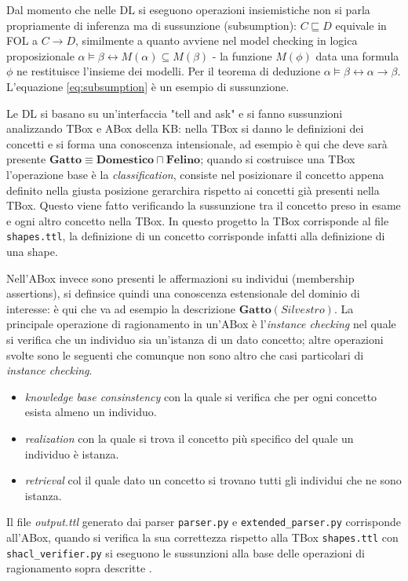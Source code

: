 \documentclass{article}
\begin{document}
Dal momento che nelle DL si eseguono operazioni insiemistiche non si parla propriamente di inferenza ma di sussunzione (subsumption): $C \sqsubseteq D$ equivale in FOL a $C \rightarrow D$, similmente a quanto avviene nel model checking in logica proposizionale $\alpha \models \beta \longleftrightarrow M(\alpha) \subseteq M(\beta)$ - la funzione $M(\phi)$ data una formula $\phi$ ne restituisce l'insieme dei modelli. Per il teorema di deduzione $\alpha \models \beta  \longleftrightarrow \alpha \rightarrow \beta$. L'equazione \ref{eq:subsumption} è un esempio di sussunzione.

Le DL si basano su un'interfaccia "tell and ask" e si fanno sussunzioni analizzando TBox e ABox della KB: nella TBox si danno le definizioni dei concetti e si forma una conoscenza intensionale, ad esempio è qui che deve sarà presente $ \textbf{Gatto} \equiv \textbf{Domestico} \sqcap \textbf{Felino} $; quando si costruisce una TBox l'operazione base è la \textit{classification}, consiste nel posizionare il concetto appena definito nella giusta posizione gerarchira rispetto ai concetti già presenti nella TBox. Questo viene fatto verificando la sussunzione tra il concetto preso in esame e ogni altro concetto nella TBox. In questo progetto la TBox corrisponde al file \texttt{shapes.ttl}, la definizione di un concetto corrisponde infatti alla definizione di una shape.

Nell'ABox invece sono presenti le affermazioni su individui (membership assertions), si definsice quindi una conoscenza estensionale del dominio di interesse: è qui che va ad esempio la descrizione $ \textbf{Gatto}(Silvestro) $. La principale operazione di ragionamento in un'ABox è l'\textit{instance checking} nel quale si verifica che un individuo sia un'istanza di un dato concetto; altre operazioni svolte sono le seguenti che comunque non sono altro che casi particolari di \textit{instance checking}. 
\begin{itemize}
    \item \textit{knowledge base consinstency} con la quale si verifica che per ogni concetto esista almeno un individuo. 
    \item \textit{realization} con la quale si trova il concetto più specifico del quale un individuo è istanza. 
    \item \textit{retrieval} col il quale dato un concetto si trovano tutti gli individui che ne sono istanza.
\end{itemize}
Il file \textit{output.ttl} generato dai parser \texttt{parser.py} e \texttt{extended\_parser.py} corrisponde all'ABox, quando si verifica la sua correttezza rispetto alla TBox \texttt{shapes.ttl} con \texttt{shacl\_verifier.py} si eseguono le sussunzioni alla base delle operazioni di ragionamento sopra descritte .
\end{document}
